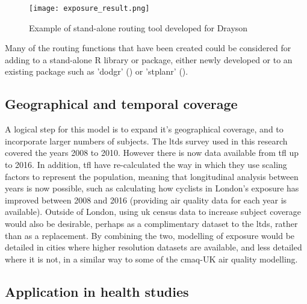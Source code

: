 \begin{figure}[H]
\centering
\texttt{[image: exposure\_result.png]}
\caption{Example of stand-alone routing tool developed for Drayson}
\label{fig:exposure_result}
\end{figure}

Many of the routing functions that have been created could be considered for adding to a stand-alone R library or package, either newly developed or to an existing package such as 'dodgr' (\cite{dodgr2018}) or 'stplanr' (\cite{strplanr2018}). 

\subsection{Geographical and temporal coverage}
\label{subsec:geographical_coverage}

A logical step for this model is to expand it's geographical coverage, and to incorporate larger numbers of subjects. The \gls{ltds} survey used in this research covered the years 2008 to 2010. However there is now data available from \gls{tfl} up to 2016. In addition, \gls{tfl} have re-calculated the way in which they use scaling factors to represent the population, meaning that longitudinal analysis between years is now possible, such as calculating how cyclists in London's exposure has improved between 2008 and 2016 (providing air quality data for each year is available). Outside of London, using \gls{uk} census data to increase subject coverage would also be desirable, perhaps as a complimentary dataset to the \gls{ltds}, rather than as a replacement. By combining the two, modelling of exposure would be detailed in cities where higher resolution datasets are available, and less detailed where it is not, in a similar way to some of the \gls{cmaq}-UK air quality modelling.

\subsection{Application in health studies}
\label{subsec:health_studies_application}

